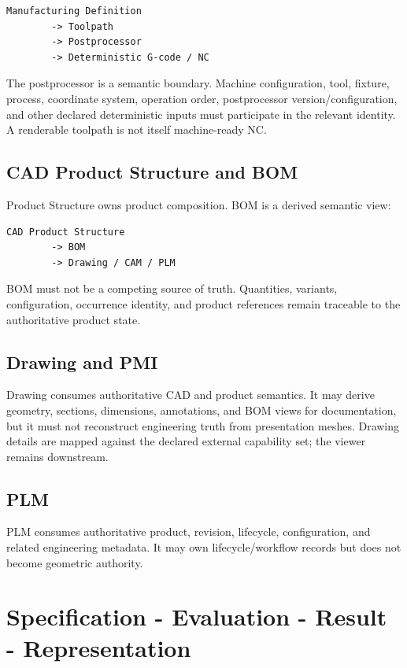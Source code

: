 \documentclass[11pt,a4paper]{report}
\begin{document}
\begin{lstlisting}
Manufacturing Definition
        -> Toolpath
        -> Postprocessor
        -> Deterministic G-code / NC
\end{lstlisting}

The postprocessor is a semantic boundary. Machine configuration, tool, fixture, process, coordinate system, operation order, postprocessor version/configuration, and other declared deterministic inputs must participate in the relevant identity. A renderable toolpath is not itself machine-ready NC.

\section{CAD Product Structure and BOM}

Product Structure owns product composition. BOM is a derived semantic view:

\begin{lstlisting}
CAD Product Structure
        -> BOM
        -> Drawing / CAM / PLM
\end{lstlisting}

BOM must not be a competing source of truth. Quantities, variants, configuration, occurrence identity, and product references remain traceable to the authoritative product state.

\section{Drawing and PMI}

Drawing consumes authoritative CAD and product semantics. It may derive geometry, sections, dimensions, annotations, and BOM views for documentation, but it must not reconstruct engineering truth from presentation meshes. Drawing details are mapped against the declared external capability set; the viewer remains downstream.

\section{PLM}
PLM consumes authoritative product, revision, lifecycle, configuration, and related engineering metadata. It may own lifecycle/workflow records but does not become geometric authority.

\chapter{Specification - Evaluation - Result - Representation}
\end{document}

